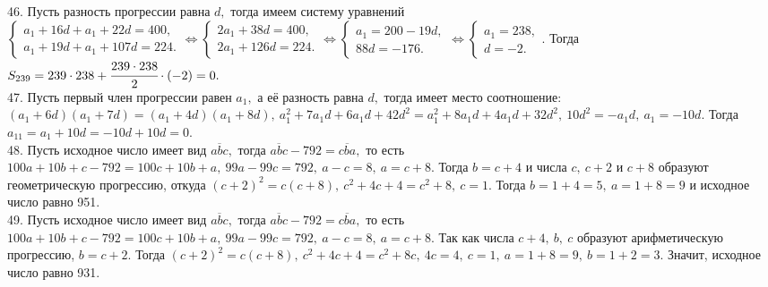 \documentclass[12pt]{article}
\begin{document}
46. Пусть разность прогрессии равна $d,$ тогда имеем систему уравнений\\ $\begin{cases} a_1+16d+a_1+22d=400,\\a_1+19d+a_1+107d=224.\end{cases}\Leftrightarrow
\begin{cases} 2a_1+38d=400,\\2a_1+126d=224.\end{cases}\Leftrightarrow
\begin{cases} a_1=200-19d,\\88d=-176.\end{cases}\Leftrightarrow
\begin{cases} a_1=238,\\ d=-2.\end{cases}.$ Тогда $S_{239}=239\cdot238+\cfrac{239\cdot238}{2}\cdot(-2)=0.$\\
47. Пусть первый член прогрессии равен $a_1,$ а её разность равна $d,$ тогда имеет место соотношение:
$(a_1+6d)(a_1+7d)=(a_1+4d)(a_1+8d),\ a_1^2+7a_1d+6a_1d+42d^2=a_1^2+8a_1d+4a_1d+32d^2,\ 10d^2=-a_1d,\ a_1=-10d.$ Тогда $a_{11}=a_1+10d=-10d+10d=0.$\\
48. Пусть исходное число имеет вид $\overline{abc},$ тогда
$\overline{abc}-792=\overline{cba},$ то есть
$100a+10b+c-792=100c+10b+a,\ 99a-99c=792,\ a-c=8,\ a=c+8.$ Тогда $b=c+4$ и числа $c,\ c+2$ и $c+8$ образуют геометрическую прогрессию, откуда $(c+2)^2=c(c+8),\ c^2+4c+4=c^2+8,\ c=1.$ Тогда $b=1+4=5,\ a=1+8=9$ и исходное число равно 951.\\
49. Пусть исходное число имеет вид $\overline{abc},$ тогда
$\overline{abc}-792=\overline{cba},$ то есть
$100a+10b+c-792=100c+10b+a,\ 99a-99c=792,\ a-c=8,\ a=c+8.$ Так как числа $c+4,\ b,\ c$ образуют арифметическую прогрессию, $b=c+2.$ Тогда $(c+2)^2=c(c+8),\ c^2+4c+4=c^2+8c,\ 4c=4,\ c=1,\ a=1+8=9,\ b=1+2=3.$ Значит, исходное число равно 931.
\newpage
\end{document}

